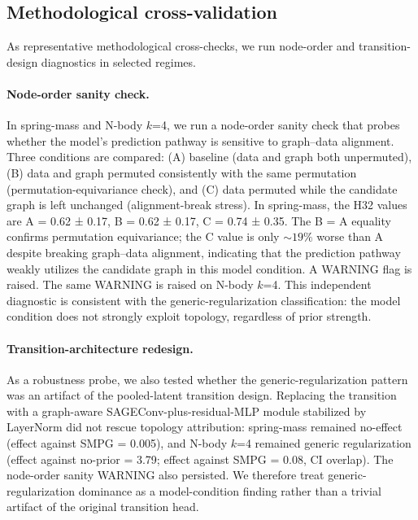 \documentclass[preprint,12pt]{elsarticle}
\begin{document}
\subsection{Methodological cross-validation}
\label{sec:cross-val}

As representative methodological cross-checks, we run node-order and 
transition-design diagnostics in selected regimes.

\paragraph{Node-order sanity check.}
In spring-mass and N-body $k$=4, we run a node-order sanity check 
that probes whether the model's prediction pathway is sensitive to 
graph–data alignment. Three conditions are compared: (A) baseline 
(data and graph both unpermuted), (B) data and graph permuted 
consistently with the same permutation (permutation-equivariance 
check), and (C) data permuted while the candidate graph is left 
unchanged (alignment-break stress). In spring-mass, the H32 values 
are A = 0.62 ± 0.17, B = 0.62 ± 0.17, C = 0.74 ± 0.35. The B = A 
equality confirms permutation equivariance; the C value is only 
$\sim 19\%$ worse than A despite breaking graph–data alignment, 
indicating that the prediction pathway weakly utilizes the candidate 
graph in this model condition. A WARNING flag is raised. The same 
WARNING is raised on N-body $k$=4. This independent diagnostic is 
consistent with the generic-regularization classification: the model 
condition does not strongly exploit topology, regardless of prior 
strength.

\paragraph{Transition-architecture redesign.}
\label{sec:transition-control}
As a robustness probe, we also tested whether the 
generic-regularization pattern was an artifact of the pooled-latent 
transition design. Replacing the transition with a graph-aware 
SAGEConv-plus-residual-MLP module stabilized by LayerNorm did not 
rescue topology attribution: spring-mass remained no-effect (effect 
against SMPG = 0.005), and N-body $k$=4 remained generic 
regularization (effect against no-prior = 3.79; effect against SMPG 
= 0.08, CI overlap). The node-order sanity WARNING also persisted. 
We therefore treat generic-regularization dominance as a 
model-condition finding rather than a trivial artifact of the 
original transition head.
\end{document}
